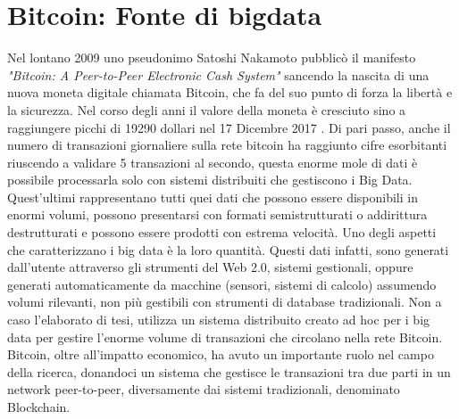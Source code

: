 \chapter{Bitcoin: Fonte di bigdata}
\label{chap:bitcoin fonte di bigdata}

Nel lontano 2009 uno pseudonimo Satoshi Nakamoto pubblicò il manifesto \textit{"Bitcoin: A Peer-to-Peer Electronic Cash System"}\cite{bitcoin:white-paper} sancendo la nascita di una nuova moneta digitale chiamata Bitcoin, che fa  del suo punto di forza la libertà e la sicurezza. Nel corso degli anni il valore della moneta è cresciuto sino a raggiungere picchi di 19290 dollari nel 17 Dicembre 2017 \cite{blockchain.com:valueOf}. Di pari passo, anche il numero di transazioni giornaliere sulla rete bitcoin ha raggiunto cifre esorbitanti riuscendo a validare 5 transazioni al secondo\cite{blockchain.com:transactions}, questa enorme mole di dati è possibile processarla solo con sistemi distribuiti che gestiscono i Big Data. Quest'ultimi rappresentano tutti quei dati che possono essere disponibili in enormi volumi, possono presentarsi con formati semistrutturati o addirittura destrutturati e possono essere prodotti con estrema velocità. Uno degli aspetti che caratterizzano i big data è la loro quantità. Questi dati infatti, sono generati dall'utente attraverso gli strumenti del Web 2.0, sistemi gestionali, oppure generati automaticamente da macchine (sensori, sistemi di calcolo) assumendo volumi rilevanti, non più gestibili con strumenti di database tradizionali. Non a caso l'elaborato di tesi, utilizza un sistema distribuito creato ad hoc per i big data per gestire l'enorme volume di transazioni che circolano nella rete Bitcoin.
\\Bitcoin, oltre all'impatto economico, ha avuto un importante ruolo nel campo della ricerca, donandoci un sistema che gestisce le transazioni tra due parti in un network peer-to-peer, diversamente dai sistemi tradizionali, denominato Blockchain.




%